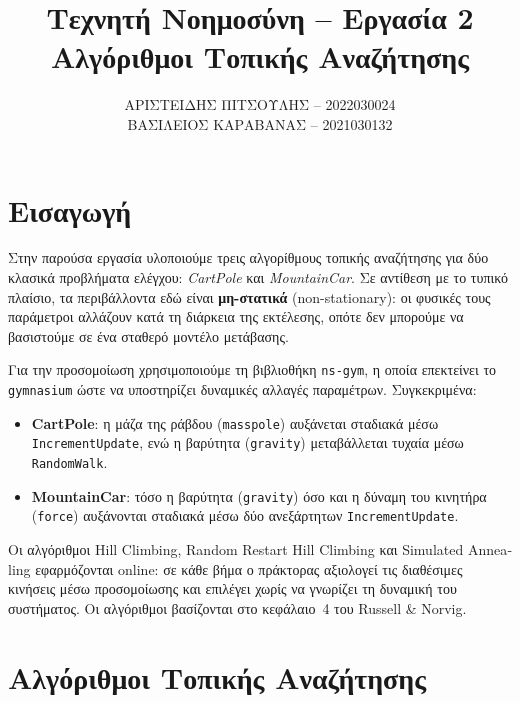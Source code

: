 \documentclass[12pt,a4paper]{article}
\title{\textbf{Τεχνητή Νοημοσύνη -- Εργασία 2} \\ Αλγόριθμοι Τοπικής Αναζήτησης}
\author{ΑΡΙΣΤΕΙΔΗΣ ΠΙΤΣΟΥΛΗΣ -- 2022030024 \\ ΒΑΣΙΛΕΙΟΣ ΚΑΡΑΒΑΝΑΣ -- 2021030132}
\date{}
\begin{document}
\maketitle
\thispagestyle{empty}

\section{Εισαγωγή}

Στην παρούσα εργασία υλοποιούμε τρεις αλγορίθμους τοπικής αναζήτησης για δύο κλασικά
προβλήματα ελέγχου: \textit{\textlatin{CartPole}} και \textit{\textlatin{MountainCar}}.
Σε αντίθεση με το τυπικό πλαίσιο, τα περιβάλλοντα εδώ είναι \textbf{μη-στατικά}
(\textlatin{non-stationary}): οι φυσικές τους παράμετροι αλλάζουν κατά τη διάρκεια της
εκτέλεσης, οπότε δεν μπορούμε να βασιστούμε σε ένα σταθερό μοντέλο μετάβασης.

Για την προσομοίωση χρησιμοποιούμε τη βιβλιοθήκη \texttt{\textlatin{ns-gym}}, η οποία
επεκτείνει το \texttt{\textlatin{gymnasium}} ώστε να υποστηρίζει δυναμικές αλλαγές
παραμέτρων. Συγκεκριμένα:

\begin{itemize}
    \item \textbf{\textlatin{CartPole}}: η μάζα της ράβδου (\texttt{\textlatin{masspole}})
    αυξάνεται σταδιακά μέσω \texttt{\textlatin{IncrementUpdate}}, ενώ η βαρύτητα
    (\texttt{\textlatin{gravity}}) μεταβάλλεται τυχαία μέσω \texttt{\textlatin{RandomWalk}}.
    \item \textbf{\textlatin{MountainCar}}: τόσο η βαρύτητα (\texttt{\textlatin{gravity}}) όσο
    και η δύναμη του κινητήρα (\texttt{\textlatin{force}}) αυξάνονται σταδιακά μέσω δύο
    ανεξάρτητων \texttt{\textlatin{IncrementUpdate}}.
\end{itemize}

Οι αλγόριθμοι \textlatin{Hill Climbing}, \textlatin{Random Restart Hill Climbing} και
\textlatin{Simulated Annealing} εφαρμόζονται \textlatin{online}: σε κάθε βήμα ο πράκτορας
αξιολογεί τις διαθέσιμες κινήσεις μέσω προσομοίωσης και επιλέγει χωρίς να γνωρίζει τη
δυναμική του συστήματος. Οι αλγόριθμοι βασίζονται στο κεφάλαιο~4 του
\textlatin{Russell \& Norvig}.


\section{Αλγόριθμοι Τοπικής Αναζήτησης}
\end{document}
